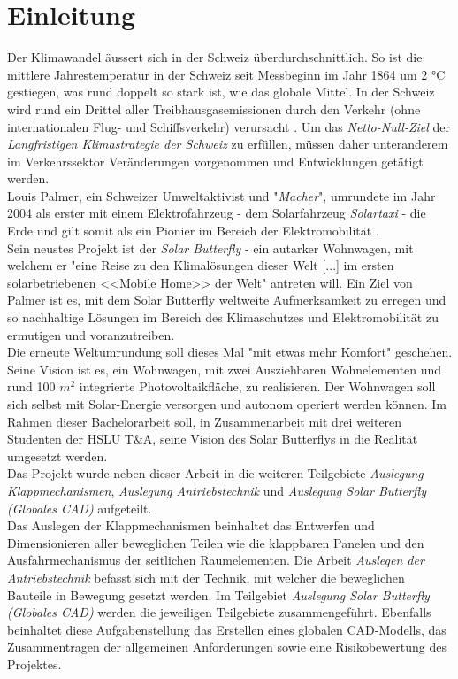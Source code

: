 \section{Einleitung}
Der Klimawandel äussert sich in der Schweiz überdurchschnittlich. So ist die mittlere Jahrestemperatur in der Schweiz seit Messbeginn im Jahr 1864 um 2 °C gestiegen, was rund doppelt so stark ist, wie das globale Mittel. In der Schweiz wird rund ein Drittel aller Treibhausgasemissionen durch den Verkehr (ohne internationalen Flug- und Schiffsverkehr) verursacht \cite{BAFU}. Um das \emph{Netto-Null-Ziel} der \emph{Langfristigen Klimastrategie der Schweiz} zu erfüllen, müssen daher unteranderem im Verkehrssektor Veränderungen vorgenommen und Entwicklungen getätigt werden.\\
Louis Palmer, ein Schweizer Umweltaktivist und "\emph{Macher}", umrundete im Jahr 2004 als erster mit einem Elektrofahrzeug - dem Solarfahrzeug \emph{Solartaxi} - die Erde und gilt somit als ein Pionier im Bereich der Elektromobilität \cite{Palmer}.\\
Sein neustes Projekt ist der \emph{Solar Butterfly} - ein autarker Wohnwagen, mit welchem er "eine Reise zu den Klimalösungen dieser Welt [...] im ersten solarbetriebenen <<Mobile Home>> der Welt" antreten will. Ein Ziel von Palmer ist es, mit dem Solar Butterfly weltweite Aufmerksamkeit zu erregen und so nachhaltige Lösungen im Bereich des Klimaschutzes und Elektromobilität zu ermutigen und voranzutreiben.\\
Die erneute Weltumrundung soll dieses Mal "mit etwas mehr Komfort" geschehen. Seine Vision ist es, ein Wohnwagen, mit zwei Ausziehbaren Wohnelementen und rund 100 $m^2$ integrierte Photovoltaikfläche, zu realisieren. Der Wohnwagen soll sich selbst mit Solar-Energie versorgen und autonom operiert werden können. Im Rahmen dieser Bachelorarbeit soll, in Zusammenarbeit mit drei weiteren Studenten der HSLU T\&A, seine Vision des Solar Butterflys in die Realität umgesetzt werden.\\
Das Projekt wurde neben dieser Arbeit in die weiteren Teilgebiete \emph{Auslegung Klappmechanismen}, \emph{Auslegung Antriebstechnik} und \emph{Auslegung Solar Butterfly (Globales CAD)} aufgeteilt.\\
Das Auslegen der Klappmechanismen beinhaltet das Entwerfen und Dimensionieren aller beweglichen Teilen wie die klappbaren Panelen und den Ausfahrmechanismus der seitlichen Raumelementen. Die Arbeit \emph{Auslegen der Antriebstechnik} befasst sich mit der Technik, mit welcher die beweglichen Bauteile in Bewegung gesetzt werden. Im Teilgebiet \emph{Auslegung Solar Butterfly (Globales CAD)} werden die jeweiligen Teilgebiete zusammengeführt. Ebenfalls beinhaltet diese Aufgabenstellung das Erstellen eines globalen CAD-Modells, das Zusammentragen der allgemeinen Anforderungen sowie eine Risikobewertung des Projektes.

